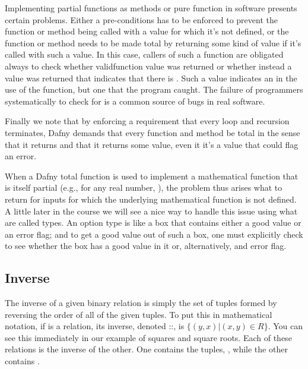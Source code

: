 \documentclass[letterpaper,10pt,english]{sphinxmanual}
\begin{document}
Implementing partial functions as methods or pure function in software
presents certain problems. Either a pre-conditions has to be enforced
to prevent the function or method being called with a value for which
it’s not defined, or the function or method needs to be made total by
returning some kind of  value if it’s called with such a value.
In this case, callers of such a function are obligated always to check
whether  validfunction value was returned or whether instead a
value was returned that indicates that there is . Such
a value indicates an  in the use of the function, but one that
the program caught. The failure of programmers systematically to check
for  is a common source of bugs in real software.

Finally we note that by enforcing a requirement that every loop and
recursion terminates, Dafny demands that every function and method be
total in the sense that it returns and that it returns some value,
even it it’s a value that could flag an error.

When a Dafny total function is used to implement a mathematical
function that is itself partial (e.g.,  for any real number,
), the problem thus arises what to return for inputs for which the
underlying mathematical function is not defined.  A little later in
the course we will see a nice way to handle this issue using what are
called  types. An option type is like a box that contains
either a good value or an error flag; and to get a good value out of
such a box, one must explicitly check to see whether the box has a
good value in it or, alternatively, and error flag.


\subsection{Inverse}
\label{\detokenize{07-set-theory:inverse}}
The inverse of a given binary relation is simply the set of tuples
formed by reversing the order of all of the given tuples. To put this
in mathematical notation, if  is a relation, its inverse, denoted
::, is \(\{ (y, x) | (x, y) \in R \}\). You can see this
immediately in our example of squares and square roots. Each of these
relations is the inverse of the other. One contains the tuples, , while the other contains .
\end{document}
